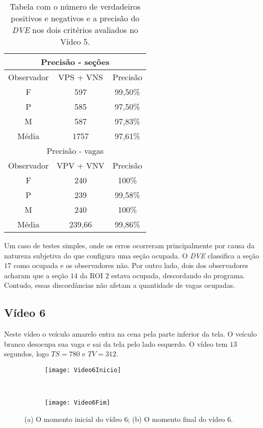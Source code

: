 \begin{table}[H]
\begin{center}
\begin{tabular}{|c||c||c|}
\hline
\multicolumn{3}{|c|}{Precisão - seções}  \\ \hline
Observador & VPS + VNS & Precisão \\ \hline
F & 597 & 99,50\% \\  \hline
P & 585 & 97,50\% \\ \hline
M & 587 & 97,83\% \\ \hline
Média & 1757 & 97,61\% \\
\hline
\hline
\multicolumn{3}{|c|}{Precisão - vagas}  \\ \hline \hline
Observador & VPV + VNV & Precisão \\ \hline
F & 240 & 100\% \\  \hline
P & 239 & 99,58\% \\ \hline
M & 240 & 100\% \\ \hline
Média & 239,66 & 99,86\% \\
\hline
\end{tabular}
\end{center}
\caption{Tabela com o número de verdadeiros positivos e negativos e a precisão do \textit{DVE} nos dois critérios avaliados no Vídeo 5.}
\label{tab:rvideo5}
\end{table}


Um caso de testes simples, onde os erros ocorreram principalmente por causa da natureza subjetiva do que configura uma seção ocupada. O \textit{DVE} classifica a seção $17$ como ocupada e os observadores não. Por outro lado, dois dos observadores acharam que a seção $14$ da ROI $2$ estava ocupada, descordando do programa. Contudo, essas discordâncias não afetam a quantidade de vagas ocupadas.

\subsection{Vídeo 6}

Neste vídeo o veículo amarelo entra na cena pela parte inferior da tela. O veículo branco desocupa sua vaga e sai da tela pelo lado esquerdo. O vídeo tem $13$ segundos, logo $TS = 780$ e $TV = 312$.

\begin{figure}[H]
\centering
\begin{subfigure}{.5\textwidth}
\centering
\texttt{[image: Video6Inicio]}
\caption{}
\end{subfigure}\
\begin{subfigure}{.5\textwidth}
\centering
\texttt{[image: Video6Fim]}
\caption{}
\end{subfigure}
\centering
\caption{(a) O momento inicial do vídeo 6; (b) O momento final do vídeo 6.}%
\label{}%
\end{figure}

